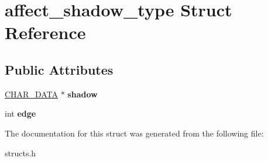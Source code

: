 \hypertarget{structaffect__shadow__type}{\section{affect\-\_\-shadow\-\_\-type Struct Reference}
\label{structaffect__shadow__type}
}
\subsection*{Public Attributes}
\begin{DoxyCompactItemize}
\item 
\hypertarget{structaffect__shadow__type_a5fb3a3032f598e437b17891fac18683c}{\hyperlink{structchar__data}{C\-H\-A\-R\-\_\-\-D\-A\-T\-A} $\ast$ {\bfseries shadow}}\label{structaffect__shadow__type_a5fb3a3032f598e437b17891fac18683c}

\item 
\hypertarget{structaffect__shadow__type_ae6504f8c4862ffceb0c60635ece1ab9b}{int {\bfseries edge}}\label{structaffect__shadow__type_ae6504f8c4862ffceb0c60635ece1ab9b}

\end{DoxyCompactItemize}


The documentation for this struct was generated from the following file\-:\begin{DoxyCompactItemize}
\item 
structs.\-h\end{DoxyCompactItemize}
